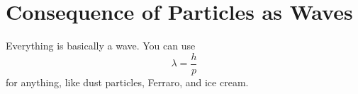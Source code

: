 \section{Consequence of Particles as Waves}
Everything is basically a wave. You can use 
\[ \lambda = \dfrac{h}{p} \]
for anything, like dust particles, Ferraro, and ice cream. 






























